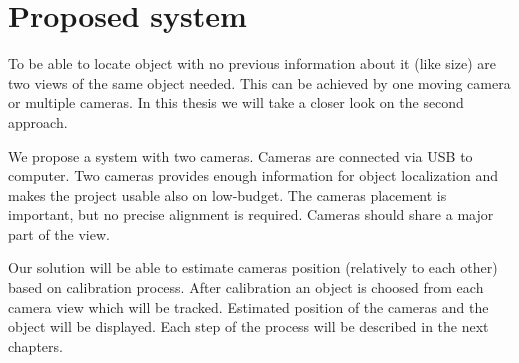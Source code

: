 \chapter{Proposed system}

To be able to locate object with no previous information about it (like size)
are two views of the same object needed. This can be achieved by one moving
camera or multiple cameras. In this thesis we will take a closer look on the
second approach.

We propose a system with two cameras. Cameras are connected via USB to
computer. Two cameras provides enough information for object localization and
makes the project usable also on low-budget. The cameras placement is
important, but no precise alignment is required. Cameras should share a major
part of the view.


Our solution will be able to estimate cameras position (relatively to each
other) based on calibration process. After calibration an object is choosed
from each camera view which will be tracked. Estimated position of the cameras
and the object will be displayed. Each step of the process will be described in
the next chapters.
